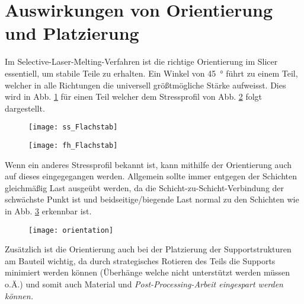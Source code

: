 \documentclass[../main.tex]{subfiles}
\begin{document}
\section{Auswirkungen von Orientierung und Platzierung}
Im Selective-Laser-Melting-Verfahren ist die richtige Orientierung im Slicer essentiell, um stabile Teile zu erhalten.
Ein Winkel von \qty{45}{\degree} führt zu einem Teil, welcher in alle Richtungen die universell größtmögliche Stärke aufweisst. Dies wird in Abb. \ref{img:ss_1} für einen Teil welcher dem Stressprofil von Abb. \ref{img:fh_1} folgt dargestellt. 
\begin{figure}[H]
	\centering
	\texttt{[image: ss\_Flachstab]}
	\label{img:ss_1}
\end{figure}
\begin{figure}[H]
	\centering
	\texttt{[image: fh\_Flachstab]}
	\label{img:fh_1}
\end{figure}

Wenn ein anderes Stressprofil bekannt ist, kann mithilfe der Orientierung auch auf dieses eingegegangen werden. Allgemein sollte immer entgegen der Schichten gleichmäßig Last ausgeübt werden, da die Schicht-zu-Schicht-Verbindung der schwächste Punkt ist und beidseitige/biegende Last normal zu den Schichten wie in Abb. \ref{img:orient_1} erkennbar ist.

\begin{figure}[H]
	\centering
	\texttt{[image: orientation]}
	\label{img:orient_1}
\end{figure}
Zusätzlich ist die Orientierung auch bei der Platzierung der Supportstrukturen am Bauteil wichtig, da durch strategisches Rotieren des Teils die Supports minimiert werden können (Überhänge welche nicht unterstützt werden müssen o.Ä.) und somit auch Material und \it{Post-Processing}-Arbeit eingespart werden können. 
\end{document}
